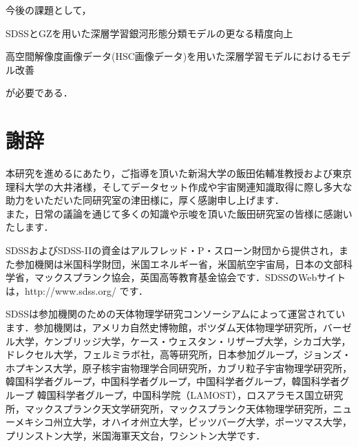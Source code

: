 \documentclass[a4j, 11pt]{jreport}
\begin{document}
今後の課題として，
\begin{inparaenum}[(1)]
 \item SDSSとGZを用いた深層学習銀河形態分類モデルの更なる精度向上
 \item 高空間解像度画像データ(HSC画像データ)を用いた深層学習モデルにおけるモデル改善
\end{inparaenum}
が必要である．



\newpage


\newpage
\chapter*{謝辞}
本研究を進めるにあたり，ご指導を頂いた新潟大学の飯田佑輔准教授および東京理科大学の大井渚様，そしてデータセット作成や宇宙関連知識取得に際し多大な助力をいただいた同研究室の津田様に，厚く感謝申し上げます．\\
また，日常の議論を通じて多くの知識や示唆を頂いた飯田研究室の皆様に感謝いたします．

SDSSおよびSDSS-IIの資金はアルフレッド・P・スローン財団から提供され，また参加機関は米国科学財団，米国エネルギー省，米国航空宇宙局，日本の文部科学省，マックスプランク協会，英国高等教育基金協会です．SDSSのWebサイトは，http://www.sdss.org/ です． 

SDSSは参加機関のための天体物理学研究コンソーシアムによって運営されています．参加機関は，アメリカ自然史博物館，ポツダム天体物理学研究所，バーゼル大学，ケンブリッジ大学，ケース・ウェスタン・リザーブ大学，シカゴ大学，ドレクセル大学，フェルミラボ社，高等研究所，日本参加グループ，ジョンズ・ホプキンス大学，原子核宇宙物理学合同研究所，カブリ粒子宇宙物理学研究所，韓国科学者グループ，中国科学者グループ，中国科学者グループ，韓国科学者グループ 韓国科学者グループ，中国科学院（LAMOST），ロスアラモス国立研究所，マックスプランク天文学研究所，マックスプランク天体物理学研究所，ニューメキシコ州立大学，オハイオ州立大学，ピッツバーグ大学，ポーツマス大学，プリンストン大学，米国海軍天文台，ワシントン大学です．
\end{document}
